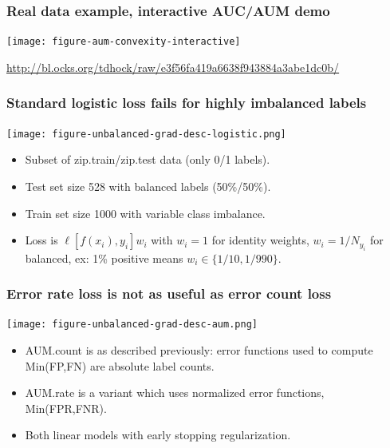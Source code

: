 \documentclass[t]{beamer}
\begin{document}
\begin{frame}
  \frametitle{Real data example, interactive AUC/AUM demo}

  \texttt{[image: figure-aum-convexity-interactive]}

  \url{http://bl.ocks.org/tdhock/raw/e3f56fa419a6638f943884a3abe1dc0b/} 

\end{frame}

\begin{frame}
  \frametitle{Standard logistic loss fails for highly imbalanced labels}

 \texttt{[image: figure-unbalanced-grad-desc-logistic.png]}

 \begin{itemize}
 \item Subset of zip.train/zip.test data (only 0/1 labels).
 \item Test set size 528 with balanced labels (50\%/50\%).
 \item Train set size 1000 with variable class imbalance.
 \item Loss is $\ell[f(x_i), y_i]w_i$ with $w_i=1$ for identity
   weights, $w_i=1/N_{y_i}$ for balanced, ex: 1\% positive means
   $w_i\in\{1/10,1/990\}$.
 \end{itemize}

\end{frame}

\begin{frame}
  \frametitle{Error rate loss is not as useful as error count loss}

 \texttt{[image: figure-unbalanced-grad-desc-aum.png]}

 \begin{itemize}
 \item AUM.count is as described previously: error functions used to
   compute Min(FP,FN) are absolute label counts.
 \item AUM.rate is a variant which uses normalized error functions,
   Min(FPR,FNR).
 \item Both linear models with early stopping regularization.
 \end{itemize}

\end{frame}
\end{document}
